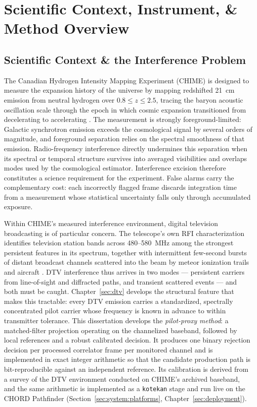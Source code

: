 
\chapter{Scientific Context, Instrument, \& Method Overview}
\label{sec:system}

\section{Scientific Context \& the Interference Problem}
\label{sec:system:science}
The Canadian Hydrogen Intensity Mapping Experiment (CHIME) is designed to measure the expansion history of the universe by mapping redshifted 21~cm emission from neutral hydrogen over $0.8 \le z \le 2.5$, tracing the baryon acoustic oscillation scale through the epoch in which cosmic expansion transitioned from decelerating to accelerating \cite{amiri2022chime}. The measurement is strongly foreground-limited: Galactic synchrotron emission exceeds the cosmological signal by several orders of magnitude, and foreground separation relies on the spectral smoothness of that emission. Radio-frequency interference directly undermines this separation when its spectral or temporal structure survives into averaged visibilities and overlaps modes used by the cosmological estimator. Interference excision therefore constitutes a science requirement for the experiment. False alarms carry the complementary cost: each incorrectly flagged frame discards integration time from a measurement whose statistical uncertainty falls only through accumulated exposure.

Within CHIME's measured interference environment, digital television broadcasting is of particular concern. The telescope's own RFI characterization identifies television station bands across 480--580~MHz among the strongest persistent features in its spectrum, together with intermittent few-second bursts of distant broadcast channels scattered into the beam by meteor ionization trails and aircraft \cite{amiri2022chime}. DTV interference thus arrives in two modes --- persistent carriers from line-of-sight and diffracted paths, and transient scattered events --- and both must be caught. Chapter~\ref{sec:dtv} develops the structural feature that makes this tractable: every DTV emission carries a standardized, spectrally concentrated pilot carrier whose frequency is known in advance to within transmitter tolerance. This dissertation develops the \emph{pilot-proxy method}: a matched-filter projection operating on the channelized baseband, followed by local references and a robust calibrated decision. It produces one binary rejection decision per processed correlator frame per monitored channel and is implemented in exact integer arithmetic so that the candidate production path is bit-reproducible against an independent reference. Its calibration is derived from a survey of the DTV environment conducted on CHIME's archived baseband, and the same arithmetic is implemented as a \texttt{kotekan} stage and run live on the CHORD Pathfinder (Section~\ref{sec:system:platforms}, Chapter~\ref{sec:deployment}).

